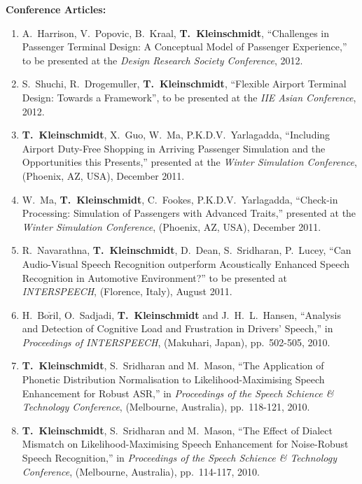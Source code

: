 \documentclass[margin,line]{resume}
\begin{document}
\begin{resume}
{{\bf Conference Articles:}
%
\begin{enumerate}
    \setlength{\itemsep}{2pt}
    \setlength{\parsep}{0pt}
    \setlength{\parskip}{0pt}

\item A.~Harrison, V.~Popovic, B.~Kraal, {\bf T.~Kleinschmidt}, ``Challenges in Passenger Terminal Design: A Conceptual Model of Passenger Experience,'' to be presented at the \emph{Design Research Society Conference}, 2012.

\item S.~Shuchi, R.~Drogemuller, {\bf T.~Kleinschmidt}, ``Flexible Airport Terminal Design: Towards a Framework'', to be presented at the \emph{IIE Asian Conference}, 2012.

\item {\bf T.~Kleinschmidt}, X.~Guo, W.~Ma, P.K.D.V.~Yarlagadda, ``Including Airport Duty-Free Shopping in Arriving Passenger Simulation and the Opportunities this Presents,'' presented at the \emph{Winter Simulation Conference}, (Phoenix, AZ, USA), December 2011.

\item W.~Ma, {\bf T.~Kleinschmidt}, C.~Fookes, P.K.D.V.~Yarlagadda, ``Check-in Processing: Simulation of Passengers with Advanced Traits,'' presented at the \emph{Winter Simulation Conference}, (Phoenix, AZ, USA), December 2011.

\item R.~Navarathna, {\bf T.~Kleinschmidt}, D.~Dean, S.~Sridharan, P.~Lucey, ``Can Audio-Visual Speech Recognition outperform Acoustically Enhanced Speech Recognition in Automotive Environment?'' to be presented at \emph{INTERSPEECH}, (Florence, Italy), August 2011.

\item H.~Bo$\mathrm{\check{r}}$il, O.~Sadjadi, {\bf T.~Kleinschmidt} and J.~H.~L.~Hansen, ``Analysis and Detection of Cognitive Load and Frustration in Drivers' Speech,'' in \emph{Proceedings of INTERSPEECH}, (Makuhari, Japan), pp.~502-505, 2010.

\item {\bf T.~Kleinschmidt}, S.~Sridharan and M.~Mason, ``The Application of Phonetic Distribution Normalisation to Likelihood-Maximising Speech Enhancement for Robust ASR,'' in \emph{Proceedings of the Speech Schience \& Technology Conference}, (Melbourne, Australia), pp.~118-121, 2010.

\item {\bf T.~Kleinschmidt}, S.~Sridharan and M.~Mason, ``The Effect of Dialect Mismatch on Likelihood-Maximising Speech Enhancement for Noise-Robust Speech Recognition,'' in \emph{Proceedings of the Speech Schience \& Technology Conference}, (Melbourne, Australia), pp.~114-117, 2010.


\end{enumerate}}
\end{resume}
\end{document}
